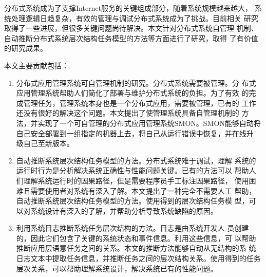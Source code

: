 \begin{cabstract}


  分布式系统成为了支撑Internet服务的关键组成部分，随着系统规模越来越大，
  系统处理逻辑日趋复杂，有效的管理与调试分布式系统成为了挑战。目前相关
  研究取得了一些进展，但很多关键问题尚待解决。本文针对分布式系统自管理
  机制、自动推断分布式系统层次结构任务模型的方法等方面进行了研究，取得
  了有价值的研究成果。

  本文主要贡献包括：

  \begin{enumerate}

    \item 分布式应用管理系统可自管理机制的研究。分布式系统需要被管理。分
    布式应用管理系统帮助人们简化了部署与维护分布式系统的负担。为了有效
    的完成管理任务，管理系统本身也是一个分布式应用，需要被管理，已有的
    工作还没有很好的解决这个问题。本文提出了使管理系统具备自管理机制的
    方法，并实现了一个可自管理的分布式应用管理系统SMON。SMON能够自动将
    自己安全部署到一组指定的机器上去，将自己从运行错误中恢复，并在线升
    级自己至新版本。

    \item 自动推断系统层次结构任务模型的方法。分布式系统难于调试，理解
    系统的运行时行为是分析解决系统正确性与性能问题关键。已有的方法可以
    帮助人们理解系统运行时的因果路径，但是需要程序员手工标注因果路径，
    使用困难且需要使用者对系统有深入了解。本文提出了一种完全不需要人工
    帮助，自动推断系统层次结构任务模型的方法。使用得到的层次结构任务模
    型，可以对系统设计有深入的了解，并帮助分析导致系统缺陷的原因。

    \item 利用系统日志推断系统任务层次结构的方法。日志是由系统开发人
    员创建的，因此它们包含了关键的系统状态和事件信息。利用这些信息，可
    以帮助推断应用层语意任务之间的关系。本文的推断方法能够自动从无结构的系
    统日志文本中提取任务信息，并推断任务之间的层次结构关系。使用得到的任务
    层次关系，可以帮助理解系统设计，解决系统已有的性能问题。

  \end{enumerate}

\end{cabstract}


